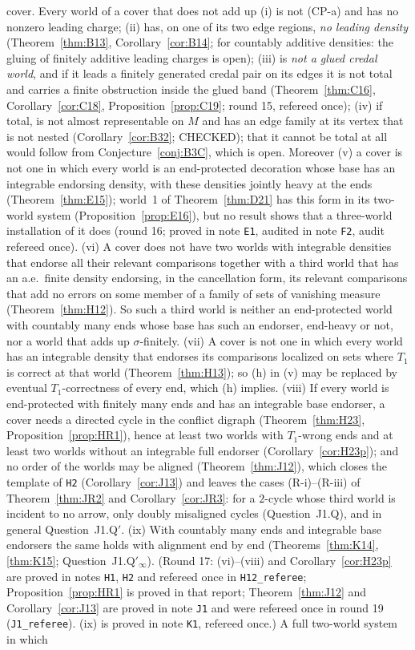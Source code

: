 \documentclass[11pt]{article}
\theoremstyle{definition}
\theoremstyle{remark}
\newcommand{\src}[1]{\texttt{#1}}
\begin{document}
cover. Every world of a cover that does not add up (i) is not (CP-a) and has no nonzero leading charge; (ii) has, on one of its two edge regions, \emph{no leading density} (Theorem~\ref{thm:B13}, Corollary~\ref{cor:B14}; for countably additive densities: the gluing of finitely additive leading charges is open); (iii) is \emph{not a glued credal world}, and if it leads a finitely generated credal pair on its edges it is not total and carries a finite obstruction inside the glued band (Theorem~\ref{thm:C16}, Corollary~\ref{cor:C18}, Proposition~\ref{prop:C19}; round 15, refereed once); (iv) if total, is not almost representable on $M$ and has an edge family at its vertex that is not nested (Corollary~\ref{cor:B32}; CHECKED); that it cannot be total at all would follow from Conjecture~\ref{conj:B3C}, which is open. Moreover (v) a cover is not one in which every world is an end-protected decoration whose base has an integrable endorsing density, with these densities jointly heavy at the ends (Theorem~\ref{thm:E15}); world~1 of Theorem~\ref{thm:D21} has this form in its two-world system (Proposition~\ref{prop:E16}), but no result shows that a three-world installation of it does (round 16; proved in note \src{E1}, audited in note \src{F2}, audit refereed once). (vi) A cover does not have two worlds with integrable densities that endorse all their relevant comparisons together with a third world that has an a.e.\ finite density endorsing, in the cancellation form, its relevant comparisons that add no errors on some member of a family of sets of vanishing measure (Theorem~\ref{thm:H12}). So such a third world is neither an end-protected world with countably many ends whose base has such an endorser, end-heavy or not, nor a world that adds up $\sigma$-finitely. (vii) A cover is not one in which every world has an integrable density that endorses its comparisons localized on sets where $T_1$ is correct at that world (Theorem~\ref{thm:H13}); so (h) in (v) may be replaced by eventual $T_1$-correctness of every end, which (h) implies. (viii) If every world is end-protected with finitely many ends and has an integrable base endorser, a cover needs a directed cycle in the conflict digraph (Theorem~\ref{thm:H23}, Proposition~\ref{prop:HR1}), hence at least two worlds with $T_1$-wrong ends and at least two worlds without an integrable full endorser (Corollary~\ref{cor:H23p}); and no order of the worlds may be aligned (Theorem~\ref{thm:J12}), which closes the template of \src{H2} (Corollary~\ref{cor:J13}) and leaves the cases (R-i)--(R-iii) of Theorem~\ref{thm:JR2} and Corollary~\ref{cor:JR3}: for a $2$-cycle whose third world is incident to no arrow, only doubly misaligned cycles (Question~J1.Q), and in general Question~J1.Q$'$. (ix) With countably many ends and integrable base endorsers the same holds with alignment end by end (Theorems~\ref{thm:K14}, \ref{thm:K15}; Question~J1.Q$'_\infty$). (Round 17: (vi)--(viii) and Corollary~\ref{cor:H23p} are proved in notes \src{H1}, \src{H2} and refereed once in \src{H12\_referee}; Proposition~\ref{prop:HR1} is proved in that report; Theorem~\ref{thm:J12} and Corollary~\ref{cor:J13} are proved in note \src{J1} and were refereed once in round 19 (\src{J1\_referee}). (ix) is proved in note \src{K1}, refereed once.) A full two-world system in which 
\end{document}
